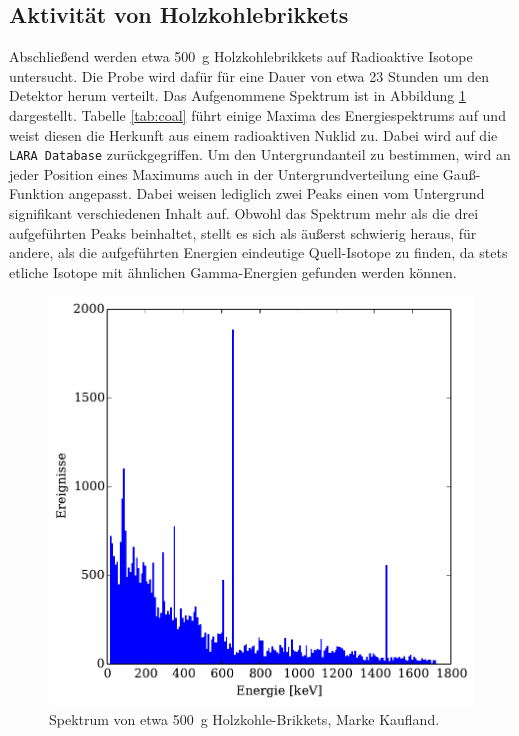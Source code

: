 \subsection{Aktivität von Holzkohlebrikkets} %
\label{sub:holzkohle}
Abschließend werden etwa \SI{500}{g} Holzkohlebrikkets auf Radioaktive
Isotope untersucht.
Die Probe wird dafür für eine Dauer von etwa \num{23} Stunden um den Detektor
herum verteilt.
Das Aufgenommene Spektrum ist in Abbildung \ref{fig:coal} dargestellt.
Tabelle \ref{tab:coal} führt einige Maxima des Energiespektrums auf und weist
diesen die Herkunft aus einem radioaktiven Nuklid zu.
Dabei wird auf die \texttt{LARA Database} \cite{lara} zurückgegriffen.
Um den Untergrundanteil zu bestimmen, wird an jeder Position eines Maximums
auch in der Untergrundverteilung eine Gauß-Funktion angepasst.
Dabei weisen lediglich zwei Peaks einen vom Untergrund signifikant verschiedenen
Inhalt auf.
Obwohl das Spektrum mehr als die drei aufgeführten Peaks beinhaltet, stellt es
sich als äußerst schwierig heraus, für andere, als die aufgeführten Energien
eindeutige Quell-Isotope zu finden, da stets etliche Isotope mit ähnlichen
Gamma-Energien gefunden werden können.
\begin{figure}[htb]
    \centering
    \includegraphics[width=0.7\linewidth]{img/08_coal.pdf}
    \caption{
        Spektrum von etwa \SI{500}{g} Holzkohle-Brikkets, Marke Kaufland.
    }
    \label{fig:coal}
\end{figure}
